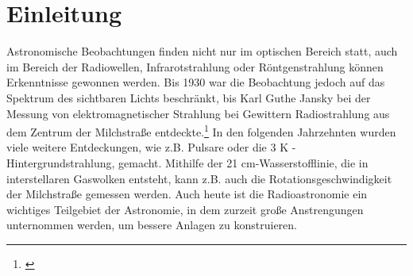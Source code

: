 \section{Einleitung}
Astronomische Beobachtungen finden nicht nur im optischen Bereich statt, auch im Bereich der Radiowellen, Infrarotstrahlung oder Röntgenstrahlung können Erkenntnisse gewonnen werden. Bis 1930 war die Beobachtung jedoch auf das Spektrum des sichtbaren Lichts beschränkt, bis Karl Guthe Jansky bei der Messung von elektromagnetischer Strahlung bei Gewittern Radiostrahlung aus dem Zentrum der Milchstraße entdeckte.\footnote{\cite{sky}} In den folgenden Jahrzehnten wurden viele weitere Entdeckungen, wie z.B. Pulsare oder die 3 K - Hintergrundstrahlung, gemacht. Mithilfe der 21 cm-Wasserstofflinie, die in interstellaren Gaswolken entsteht, kann z.B. auch die Rotationsgeschwindigkeit der Milchstraße gemessen werden. Auch heute ist die Radioastronomie ein wichtiges Teilgebiet der Astronomie, in dem zurzeit große Anstrengungen unternommen werden, um bessere Anlagen zu konstruieren. 